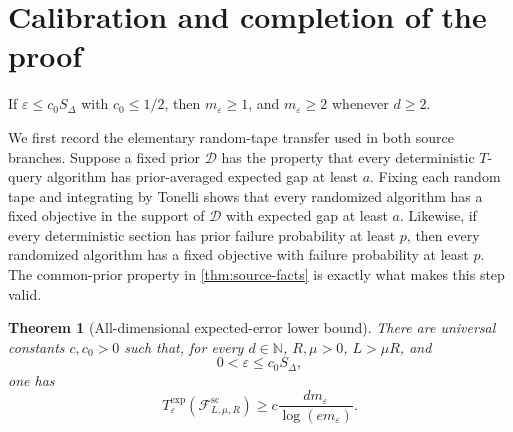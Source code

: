 \documentclass[11pt]{article}
\newcommand{\cF}{\mathcal{F}}
\newcommand{\cD}{\mathcal{D}}
\newcommand{\eps}{\varepsilon}
\theoremstyle{plain}
\newtheorem{theorem}{Theorem}[section]
\theoremstyle{definition}
\begin{document}
\section{Calibration and completion of the proof}\label{sec:calibration}

If $\eps\le c_0S_\Delta$ with $c_0\le1/2$, then $m_\eps\ge1$, and $m_\eps\ge2$ whenever $d\ge2$.

We first record the elementary random-tape transfer used in both source branches.  Suppose a fixed prior $\cD$ has the property that every deterministic $T$-query algorithm has prior-averaged expected gap at least $a$.  Fixing each random tape and integrating by Tonelli shows that every randomized algorithm has a fixed objective in the support of $\cD$ with expected gap at least $a$.  Likewise, if every deterministic section has prior failure probability at least $p$, then every randomized algorithm has a fixed objective with failure probability at least $p$.  The common-prior property in \cref{thm:source-facts} is exactly what makes this step valid.

\begin{theorem}[All-dimensional expected-error lower bound]\label{thm:expected-lower}
There are universal constants $c,c_0>0$ such that, for every $d\in\mathbb N$, $R,\mu>0$, $L>\mu R$, and
\[
   0<\eps\le c_0S_\Delta,
\]
one has
\begin{equation}\label{eq:expected-main-lb}
  T^{\mathrm{exp}}_\eps(\cF^{\mathrm{sc}}_{L,\mu,R})
  \ge c\frac{d m_\eps}{\log(e m_\eps)}.
\end{equation}
\end{theorem}
\end{document}
